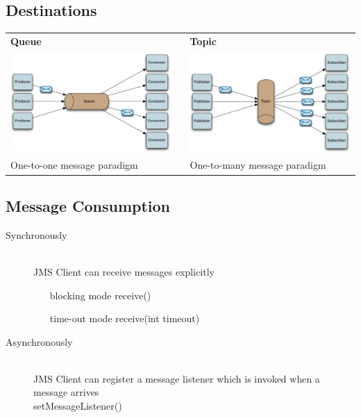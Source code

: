 \documentclass[10pt]{article}
\begin{document}
\subsection{Destinations}
\begin{tabular}{l p{2cm} l}
	\textbf{Queue} && \textbf{Topic} \\
	\includegraphics[scale=0.3]{images/jms-destination-queue.png} && \includegraphics[scale=0.3]{images/jms-destination-topic.png} \\
	One-to-one message paradigm && One-to-many message paradigm	
\end{tabular}
\subsection{Message Consumption}
\begin{description}
	\item[Synchronously] \hfill \\
		JMS Client can receive messages explicitly
		\begin{itemize}
			\item[blocking mode] receive()
			\item[time-out mode] receive(int timeout)
		\end{itemize}
	\item[Asynchronously] \hfill \\
		JMS Client can register a message listener which is invoked when a message arrives \\
		setMessageListener()
\end{description}
\end{document}
